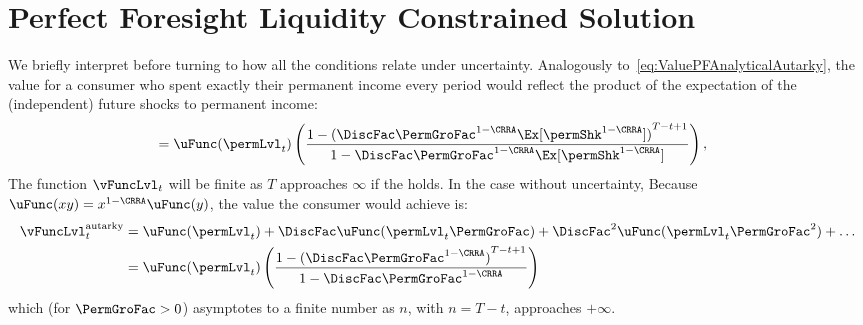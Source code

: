 \documentclass[\econtexRoot/BufferStockTheory]{subfiles}
\begin{document}
\let\TableWidth\relax
{\newlength\TableWidth}

\hypertarget{ApndxLiqConstr}{}
\section{Perfect Foresight Liquidity Constrained Solution}\label{sec:ApndxLiqConstr}

\hypertarget{Autarky-Value}{}
We briefly interpret {\FVAC} before turning to how all the conditions relate under uncertainty. Analogously to~\eqref{eq:ValuePFAnalyticalAutarky}, the value for a consumer who spent exactly their permanent income every period would reflect the product of the expectation of the (independent) future shocks to permanent income:\hypertarget{uInvEuPermShkDefn}{}
\begin{align*}
             & = \uFunc(\permLvl_{t})\left(\frac{1-{(\DiscFac \PermGroFac^{1-\CRRA}\Ex[\permShk^{1-\CRRA}])}^{T-t+1}}{1-\DiscFac \PermGroFac^{1-\CRRA} \Ex[\permShk^{1-\CRRA}]}\right),
\end{align*}
%
The function $\vFuncLvl_{t}$ will be finite as $T$ approaches $\infty$ if the {\FVAC} holds.
In the case without uncertainty, Because $\uFunc(xy) = x^{1-\CRRA}\uFunc(y)$, the value the consumer would achieve is: 
%
%
%
\begin{equation}\begin{gathered}\begin{aligned}  
      \vFuncLvl_{t}^{\text{autarky}}  & = \uFunc(\permLvl_{t})+\DiscFac \uFunc(\permLvl_{t}\PermGroFac)+\DiscFac^{2} \uFunc(\permLvl_{t} \PermGroFac^{2})+\ldots \label{eq:ValuePFAnalyticalAutarky}
      \\  & = \uFunc(\permLvl_{t})\left(\frac{1-{(\DiscFac \PermGroFac^{1-\CRRA})}^{T-t+1}}{1-\DiscFac \PermGroFac^{1-\CRRA}}\right) \notag
    \end{aligned}\end{gathered}\end{equation}
which (for $\PermGroFac>0$) asymptotes to a finite number as $n$, with $n=T-t$, approaches $+\infty$.
\end{document}
